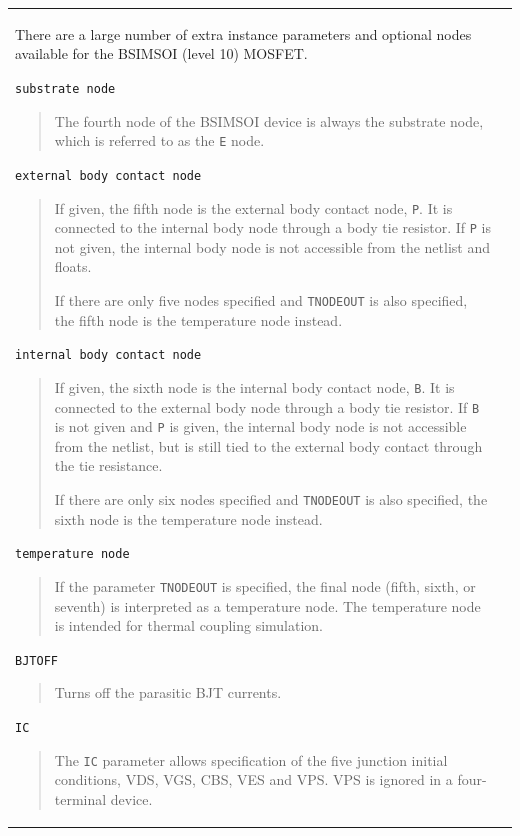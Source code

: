 \begin{longtable}[Hh]{>{\setlength{\hsize}{.4\hsize}}YY}
There are a large number of extra instance parameters and optional
nodes available for the BSIMSOI (level 10) MOSFET.

\texttt{substrate node}
\begin{quote}
The fourth node of the BSIMSOI device is always the substrate node, which 
is referred to as the \texttt{E} node.
\end{quote}

\texttt{external body contact node}
\begin{quote}
If given, the fifth node is the external body contact node, {\texttt
P}.  It is connected to the internal body node through a body tie
resistor.  If \texttt{P} is not given, the internal body node is not
accessible from the netlist and floats.

If there are only five nodes specified and \texttt{TNODEOUT} is also specified, the fifth node is the temperature node instead.
\end{quote}

\texttt{internal body contact node}
\begin{quote}
If given, the sixth node is the internal body contact node, {\texttt
B}.  It is connected to the external body node through a body tie
resistor.  If \texttt{B} is not given and \texttt{P} is given, the internal 
body node is not accessible from the netlist, but is still tied to the 
external body contact through the tie resistance.

If there are only six nodes specified and \texttt{TNODEOUT} is also specified, the sixth node is the temperature node instead.
\end{quote}

\texttt{temperature node}
\begin{quote}
If the parameter \texttt{TNODEOUT} is specified, the final node (fifth, sixth, or seventh) is interpreted as a temperature node.  The temperature node is intended for thermal coupling simulation.
\end{quote}

\texttt{BJTOFF}
\begin{quote}
Turns off the parasitic BJT currents.
\end{quote}

\texttt{IC}
\begin{quote}
The \texttt{IC} parameter allows specification of the five junction initial conditions, VDS, VGS, CBS, VES and VPS.  VPS is ignored in a four-terminal device.
\end{quote}


\end{longtable}
